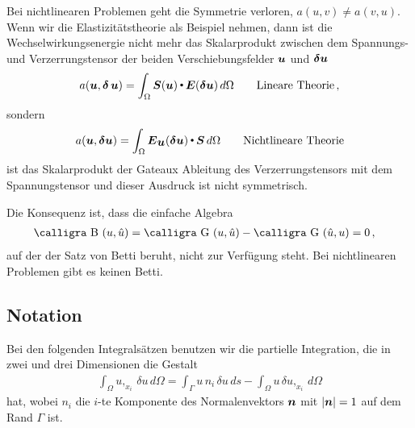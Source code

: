 Bei nichtlinearen Problemen geht die Symmetrie verloren, $a(u,v) \neq a(v,u)$. Wenn wir die Elastizit\"{a}tstheorie als Beispiel nehmen, dann ist die Wechselwirkungsenergie nicht mehr das Skalarprodukt zwischen dem Spannungs- und Verzerrungstensor der beiden Verschiebungsfelder $\mbox{\boldmath $u$}$ und $\mbox{\boldmath $\delta$} \mbox{\boldmath $u$}$
\begin{align}
a(\mbox{\boldmath $u$}, \mbox{\boldmath $\delta$}\, \mbox{\boldmath $u$}) = \int_{\Omega} \mbox{\boldmath $S$}(\mbox{\boldmath $u$}) {\,\scriptscriptstyle \stackrel{\bullet}{{}}}\,  \mbox{\boldmath $E$}(\mbox{\boldmath $\delta$} \mbox{\boldmath $u$}) \,d\Omega \qquad \text{Lineare Theorie}\,,
\end{align}
sondern
\begin{align}
a(\mbox{\boldmath $u$}, \mbox{\boldmath $\delta$} \mbox{\boldmath $u$}) = \int_{\Omega} \mbox{\boldmath $E$}_{\mbox{\boldmath $u$}}(\mbox{\boldmath $\delta$} \mbox{\boldmath $u$}) {\,\scriptscriptstyle \stackrel{\bullet}{{}}}\, \mbox{\boldmath $S$}\,d\Omega\qquad \text{Nichtlineare Theorie}
\end{align}
ist das Skalarprodukt der Gateaux Ableitung des Verzerrungstensors mit dem Spannungstensor und dieser Ausdruck ist nicht symmetrisch.

Die Konsequenz ist, dass die einfache Algebra
\begin{align}
\text{\normalfont\calligra B\,\,}(u,\hat{u}) &= \text{\normalfont\calligra G\,\,}(u, \hat{u}) - \text{\normalfont\calligra G\,\,}(\hat{u}, u)= 0\,,
\end{align}
auf der der Satz von Betti beruht, nicht zur Verf\"{u}gung steht. Bei nichtlinearen Problemen gibt es keinen \glq Betti\grq{}.

\pagebreak
\textcolor{sectionTitleBlue}{\section{Notation}}
Bei den folgenden Integrals\"{a}tzen benutzen wir die partielle Integration, die in zwei und drei Dimensionen die Gestalt
\begin{align}\label{Eq19}
\int_{\Omega} u,_{x_i}\,\delta u \,d\Omega = \int_{\Gamma} u \, n_i\, \delta u\,ds - \int_{\Omega} u\,\delta u,_{x_i} \,d\Omega
\end{align}
hat, wobei $n_i$ die $i$-te Komponente des Normalenvektors $\mbox{\boldmath $n$}$ mit $|\mbox{\boldmath $n$}| = 1$ auf dem Rand $\Gamma$ ist.

